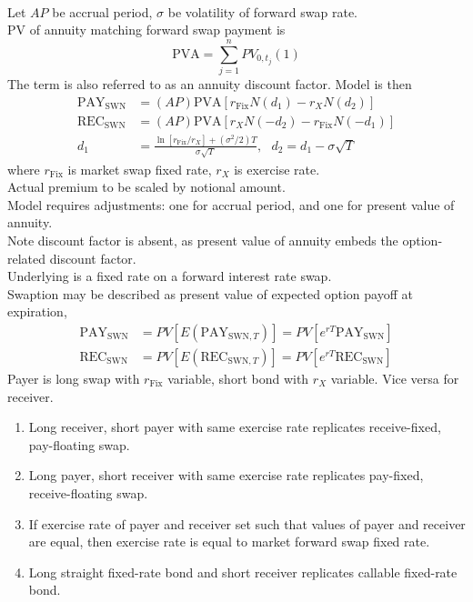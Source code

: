 \begin{remark} \\
Let $AP$ be accrual period, $\sigma$ be volatility of forward swap rate.\\
PV of annuity matching forward swap payment is
\begin{equation}
\text{PVA} = \sum\limits_{j=1}^n PV_{0, t_j} (1) \nonumber
\end{equation}
The term is also referred to as an annuity discount factor. Model is then
\begin{align}
\text{PAY}_{\text{SWN}} &= (AP) \text{PVA} [r_{\text{Fix}} N(d_1) - r_{X} N(d_2)] \nonumber \\
\text{REC}_{\text{SWN}} &= (AP) \text{PVA} [r_{X} N(-d_2) - r_{\text{Fix}} N(-d_1)] \nonumber \\
d_1 &= \frac{\ln[r_{\text{Fix}}/r_X] + (\sigma^2/2)T}{\sigma \sqrt{T}}, \ \ \ d_2 = d_1 - \sigma\sqrt{T} \nonumber
\end{align}
where $r_{\text{Fix}}$ is market swap fixed rate, $r_X$ is exercise rate.\\
Actual premium to be scaled by notional amount.\\
Model requires adjustments: one for accrual period, and one for present value of annuity.\\
Note discount factor is absent, as present value of annuity embeds the option-related discount factor.\\
Underlying is a fixed rate on a forward interest rate swap.\\
Swaption may be described as present value of expected option payoff at expiration,
\begin{align}
\text{PAY}_{\text{SWN}} &= PV[E(\text{PAY}_{\text{SWN}, T})] = PV[e^{rT} \text{PAY}_{\text{SWN}}] \nonumber \\
\text{REC}_{\text{SWN}} &= PV[E(\text{REC}_{\text{SWN}, T})] = PV[e^{rT} \text{REC}_{\text{SWN}}] \nonumber
\end{align}
Payer is long swap with $r_{\text{Fix}}$ variable, short bond with $r_X$ variable. Vice versa for receiver.
\end{remark}

\begin{remark} 
\begin{enumerate}[label=\roman*.]
\setlength{\itemsep}{0pt}
\item Long receiver, short payer with same exercise rate replicates receive-fixed, pay-floating swap.
\item Long payer, short receiver with same exercise rate replicates pay-fixed, receive-floating swap.
\item If exercise rate of payer and receiver set such that values of payer and receiver are equal, then exercise rate is equal to market forward swap fixed rate.
\item Long straight fixed-rate bond and short receiver replicates callable fixed-rate bond.
\end{enumerate}
\end{remark}

